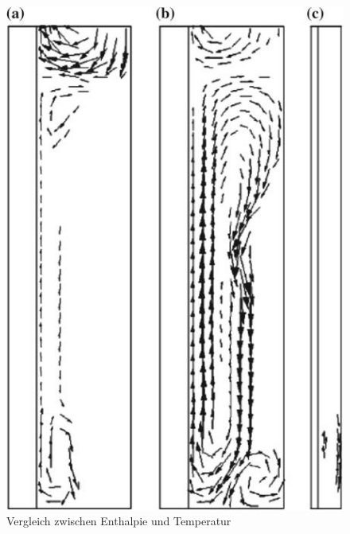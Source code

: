 \documentclass[11pt,a4paper]{scrartcl}
\begin{document}
\begin{figure}[h!]
\begin{center}
\includegraphics[scale=0.6]{images/simulatedvelocity.jpg}
\caption{Vergleich zwischen Enthalpie und Temperatur \cite{WasteEnergyHarvesting}}
\label{fig:simulatedvelocity}
\end{center}
\end{figure}
\end{document}
